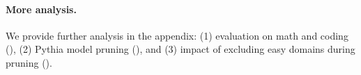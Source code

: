 \paragraph{More analysis.} We provide further analysis in the appendix: (1) \ours{} evaluation on math and coding (), (2) Pythia model pruning (), and (3) impact of excluding easy domains during pruning ().
